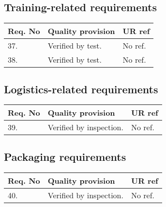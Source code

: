\subsection{Training-related requirements}
\begin{center}
    \begin{tabular}{ | l | p{9cm} | l |}
    \hline
    Req. No & Quality provision  & UR ref \\ \hline
    37. & Verified by test. & No ref. \\ \hline
    38. & Verified by test. & No ref. \\ \hline
    \end{tabular}
\end{center}

\subsection{Logistics-related requirements}
\begin{center}
    \begin{tabular}{ | l | p{9cm} | l |}
    \hline
    Req. No & Quality provision  & UR ref \\ \hline
    39. & Verified by inspection. & No ref. \\ \hline
    \end{tabular}
\end{center}

\subsection{Packaging requirements}
\begin{center}
    \begin{tabular}{ | l | p{9cm} | l |}
    \hline
    Req. No & Quality provision  & UR ref \\ \hline
    40. & Verified by inspection. & No ref. \\ \hline
    \end{tabular}
\end{center}
